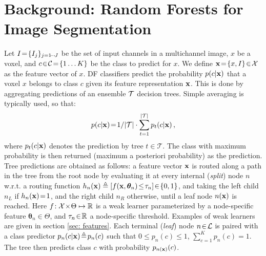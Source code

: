 
\section{Background: Random Forests for Image Segmentation}
\label{sec: background}

Let $I\!=\!\{I_j\}_{j=1\!\cdots\! J}$ be the set of input channels in a multichannel image, $x$ be a voxel, 
and $c\!\in\!\mathcal{C}\!=\!\{1 \dots K\}$ be the class to predict for $x$.
We define $\boldsymbol{\mathrm{x}}\!=\!\{x,I\}\!\in\!\mathcal{X}$ as the feature vector of $x$. DF classifiers predict the probability 
$p(c\vert\boldsymbol{\mathrm{x}})$ that a voxel $x$ belongs to class $c$ given its feature representation $\boldsymbol{\mathrm{x}}$. 
This is done by aggregating 
predictions of an ensemble $\mathcal{T}$ decision trees. Simple averaging is typically used, so that: 
$$p(c\vert\boldsymbol{\mathrm{x}})\!=\!1/\vert\mathcal{T}\vert\cdot\sum_{t=1}^{\vert\mathcal{T}\vert}p_t(c\vert\boldsymbol{\mathrm{x}})\, ,$$
where $p_t(c\vert\boldsymbol{\mathrm{x}})$ denotes the prediction by tree $t \in \mathcal{T}$. 
The class with maximum probability is then returned (maximum a posteriori probability) as the prediction. 
Tree predictions are obtained as follows: a feature vector $\boldsymbol{\mathrm{x}}$ is routed along a path in the tree from the 
root node by evaluating it at every internal (\textit{split}) node $n$ w.r.t. a routing function 
$h_n(\boldsymbol{\mathrm{x}})\triangleq[f(\boldsymbol{\mathrm{x}},\bm{\theta}_n)\!\leq\!\tau_n]\!\in\!\{0,1\}$, and taking the 
left child $n_L$ if $h_n(\boldsymbol{\mathrm{x}})\!=\!1$, and the right child $n_R$ otherwise, until a leaf node $n(\boldsymbol{\mathrm{x}})$ is reached. 
Here $f\!:\mathcal{X}\!\times\!\Theta\mapsto\mathbb{R}$ is a weak learner parameterized by a node-specific feature 
$\bm{\theta}_n\!\in\!\Theta$, and $\tau_n\!\in\!\mathbb{R}$ a node-specific threshold. Examples of weak learners are given in section \ref{sec: features}. Each terminal (\textit{leaf}) node $n\!\in\!\mathcal{L}$ is paired with a class predictor $p_n(c\vert \boldsymbol{\mathrm{x}})\!\triangleq\!p_n(c)$ such that $0\!\leq\!p_n(c)\!\leq\!1$, $\sum_{c=1}^Kp_n(c)\!=\!1$. The tree then predicts class $c$ with probability $p_{n(\boldsymbol{\mathrm{x}})}(c)$. 


